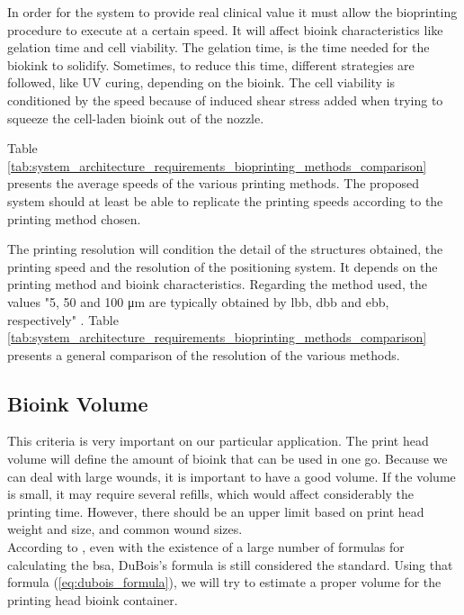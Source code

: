 In order for the system to provide real clinical value it must allow the bioprinting procedure to execute at a certain speed. It will affect bioink characteristics like gelation time and cell viability. The gelation time, is the time needed for the biokink to solidify. Sometimes, to reduce this time, different strategies are followed, like UV curing, depending on the bioink. The cell viability is conditioned by the speed because of induced shear stress added when trying to squeeze the cell-laden bioink out of the nozzle. 

Table \ref{tab:system_architecture_requirements_bioprinting_methods_comparison} presents the average speeds of the various printing methods. The proposed system should at least be able to replicate the printing speeds according to the printing method chosen.

The printing resolution will condition the detail of the structures obtained, the printing speed and the resolution of the positioning system. It depends on the printing method and bioink characteristics. Regarding the method used, the values "5, 50 and 100 \si{\micro\meter} are typically obtained by \gls{lbb}, \gls{dbb} and \gls{ebb}, respectively" \cite{Datta2018_essential_steps_bioprinting}. Table \ref{tab:system_architecture_requirements_bioprinting_methods_comparison} presents a general comparison of the resolution of the various methods.


\subsection{Bioink Volume}
\label{subsec:system_architecture_requirements_bioprinting_bioink_volume}

This criteria is very important on our particular application. The print head volume will define the amount of bioink that can be used in one go. Because we can deal with large wounds, it is important to have a good volume. If the volume is small, it may require several refills, which would affect considerably the printing time. However, there should be an upper limit based on print head weight and size, and common wound sizes.\\

According to \citeauthor{Redlarski2016_bsa_formulae_alarming_ambiguity} \cite{Redlarski2016_bsa_formulae_alarming_ambiguity}, even with the existence of a large number of formulas for calculating the \gls{bsa}, DuBois's formula \cite{DuBOIS1916_formula} is still considered the standard. Using that formula (\ref{eq:dubois_formula}), we will try to estimate a proper volume for the printing head bioink container.

